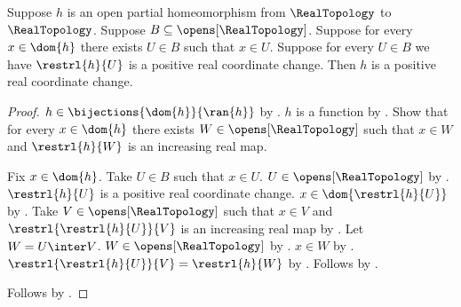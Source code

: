\begin{theorem}\label{positive_real_change_locality}
    Suppose $h$ is an open partial homeomorphism from $\RealTopology$ to $\RealTopology$.
    Suppose $B\subseteq\opens[\RealTopology]$.
    Suppose for every $x\in\dom{h}$ there exists $U\in B$ such that $x\in U$.
    Suppose for every $U\in B$ we have $\restrl{h}{U}$ is a positive real coordinate change.
    Then $h$ is a positive real coordinate change.
\end{theorem}
\begin{proof}
    $h\in\bijections{\dom{h}}{\ran{h}}$ by
        .
    $h$ is a function by .
    Show that for every $x\in\dom{h}$ there exists $W\in\opens[\RealTopology]$
        such that $x\in W$ and $\restrl{h}{W}$ is an increasing real map.
    \begin{subproof}
        Fix $x\in\dom{h}$.
        Take $U\in B$ such that $x\in U$.
        $U\in\opens[\RealTopology]$ by .
        $\restrl{h}{U}$ is a positive real coordinate change.
        $x\in\dom{\restrl{h}{U}}$ by .
        Take $V\in\opens[\RealTopology]$ such that $x\in V$ and
            $\restrl{\restrl{h}{U}}{V}$ is an increasing real map by
            .
        Let $W=U\inter V$.
        $W\in\opens[\RealTopology]$ by .
        $x\in W$ by .
        $\restrl{\restrl{h}{U}}{V}=\restrl{h}{W}$ by
            .
        Follows by \auto.
    \end{subproof}
    Follows by .
\end{proof}

